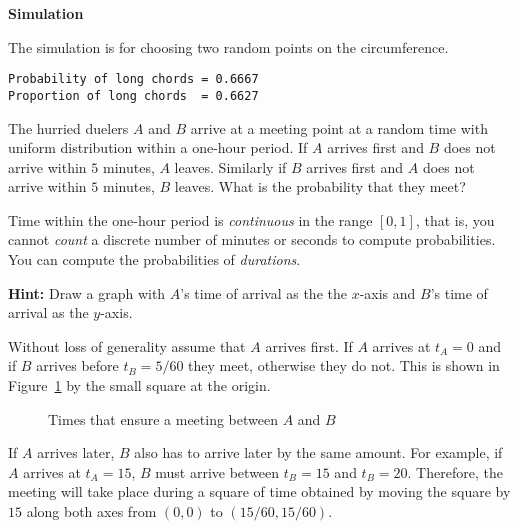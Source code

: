 \textbf{Simulation}

The simulation is for choosing two random points on the circumference.
\begin{verbatim}
Probability of long chords = 0.6667
Proportion of long chords  = 0.6627
\end{verbatim}


\begin{prob}{The hurried duelers}
$A$ and $B$ arrive at a meeting point at a random time with uniform distribution within a one-hour period. If $A$ arrives first and $B$ does not arrive within $5$ minutes, $A$ leaves. Similarly if $B$ arrives first and $A$ does not arrive within $5$ minutes, $B$ leaves. What is the probability that they meet?

Time within the one-hour period is \emph{continuous} in the range $[0,1]$, that is, you cannot \emph{count} a discrete number of minutes or seconds to compute probabilities. You can compute the probabilities of \emph{durations}.

\textbf{Hint:} Draw a graph with $A$'s time of arrival as the the $x$-axis and $B$'s time of arrival as the $y$-axis.
\end{prob}

\solution{}

Without loss of generality assume that $A$ arrives first. If $A$ arrives at $t_A=0$ and if $B$ arrives before $t_B=5/60$ they meet, otherwise they do not. This is shown in Figure~\ref{f.duel} by the small square at the origin.
\begin{figure}[tb]
\begin{center}
\end{center}
\caption{Times that ensure a meeting between $A$ and $B$}\label{f.duel}
\end{figure}
If $A$ arrives later, $B$ also has to arrive later by the same amount. For example, if $A$ arrives at $t_A=15$, $B$ must arrive between $t_B=15$ and $t_B=20$. Therefore, the meeting will take place during a square of time obtained by moving the square by $15$ along both axes from $(0,0)$ to $(15/60,15/60)$.

